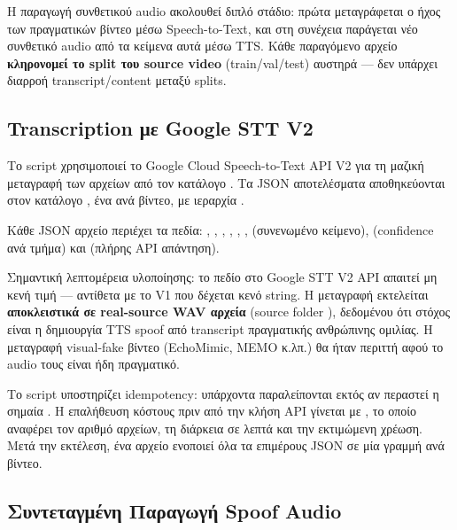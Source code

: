 Η παραγωγή συνθετικού audio ακολουθεί διπλό στάδιο: πρώτα μεταγράφεται
ο ήχος των πραγματικών βίντεο μέσω Speech-to-Text, και στη συνέχεια
παράγεται νέο συνθετικό audio από τα κείμενα αυτά μέσω TTS.
Κάθε παραγόμενο αρχείο \textbf{κληρονομεί το split του source video}
(train/val/test) αυστηρά — δεν υπάρχει διαρροή transcript/content
μεταξύ splits.

\subsection{Transcription με Google STT V2}
\label{subsec:google-stt}

Το script  χρησιμοποιεί
το Google Cloud Speech-to-Text API V2 για τη μαζική μεταγραφή των
 αρχείων από τον κατάλογο .
Τα JSON αποτελέσματα αποθηκεύονται στον κατάλογο
, ένα  ανά βίντεο,
με ιεραρχία .

Κάθε JSON αρχείο περιέχει τα πεδία:
, , ,
, , ,
 (συνενωμένο κείμενο), 
(confidence ανά τμήμα) και  (πλήρης API απάντηση).

Σημαντική λεπτομέρεια υλοποίησης: το πεδίο  στο Google
STT V2 API απαιτεί μη κενή τιμή — αντίθετα με το V1 που δέχεται
κενό string.
Η μεταγραφή εκτελείται \textbf{αποκλειστικά σε real-source WAV αρχεία}
(source folder ), δεδομένου ότι στόχος είναι η δημιουργία
TTS spoof από transcript πραγματικής ανθρώπινης ομιλίας.
Η μεταγραφή visual-fake βίντεο (EchoMimic, MEMO κ.λπ.) θα ήταν
περιττή αφού το audio τους είναι ήδη πραγματικό.

Το script υποστηρίζει idempotency: υπάρχοντα  παραλείπονται
εκτός αν περαστεί η σημαία .
Η επαλήθευση κόστους πριν από την κλήση API γίνεται με
, το οποίο αναφέρει τον αριθμό αρχείων,
τη διάρκεια σε λεπτά και την εκτιμώμενη χρέωση.
Μετά την εκτέλεση, ένα αρχείο  ενοποιεί
όλα τα επιμέρους JSON σε μία γραμμή ανά βίντεο.

\subsection{Συντεταγμένη Παραγωγή Spoof Audio}
\label{subsec:tts-production}

